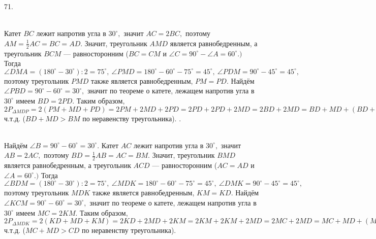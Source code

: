 71. \begin{figure}[ht!]
\end{figure}\\
Катет $BC$ лежит напротив угла в $30^\circ,$ значит $AC=2BC,$ поэтому $AM=\frac{1}{2}AC=BC=AD.$ Значит, треугольник $AMD$ является равнобедренным, а треугольник $BCM$ --- равносторонним ($BC=CM$ и $\angle C=90^\circ-\angle A=60^\circ.)$ Тогда $\angle DMA=(180^\circ-30^\circ):2=75^\circ,\ \angle PMD=180^\circ-60^\circ-75^\circ=45^\circ,\ \angle PDM=90^\circ-45^\circ=45^\circ,$ поэтому треугольник $PMD$ также является равнобедренным, $PM=PD.$ Найдём $\angle PBD=90^\circ-60^\circ=30^\circ,$ значит по теореме о катете, лежащем напротив угла в $30^\circ$ имеем $BD=2PD.$ Таким образом, $2P_{\Delta MDP}=2(PM+MD+PD)=
2PM+2MD+2PD=2PD+2PD+2MD=2BD+2MD=BD+MD+(BD+MD)>BD+MD+BM=P_{\Delta MDB},$ ч.т.д. ($BD+MD>BM$ по неравенству треугольника).\newpage
{}. \begin{figure}[ht!]
\end{figure}\\
Найдём $\angle B=90^\circ-60^\circ=30^\circ.$ Катет $AC$ лежит напротив угла в $30^\circ,$ значит $AB=2AC,$ поэтому $BD=\frac{1}{2}AB=AC=BM.$ Значит, треугольник $BMD$ является равнобедренным, а треугольник $ACD$ --- равносторонним ($AC=AD$ и $\angle A=60^\circ.)$ Тогда $\angle BDM=(180^\circ-30^\circ):2=75^\circ,\ \angle MDK=180^\circ-60^\circ-75^\circ=45^\circ,\ \angle DMK=90^\circ-45^\circ=45^\circ,$ поэтому треугольник $MDK$ также является равнобедренным, $KM=KD.$ Найдём $\angle KCM=90^\circ-60^\circ=30^\circ,$ значит по теореме о катете, лежащем напротив угла в $30^\circ$ имеем $MC=2KM.$ Таким образом, $2P_{\Delta MDK}=2(KD+MD+KM)=
2KD+2MD+2KM=2KM+2KM+2MD=2MC+2MD=MC+MD+(MC+MD)>MC+MD+CD=P_{\Delta DMC},$ ч.т.д. ($MC+MD>CD$ по неравенству треугольника).\\
